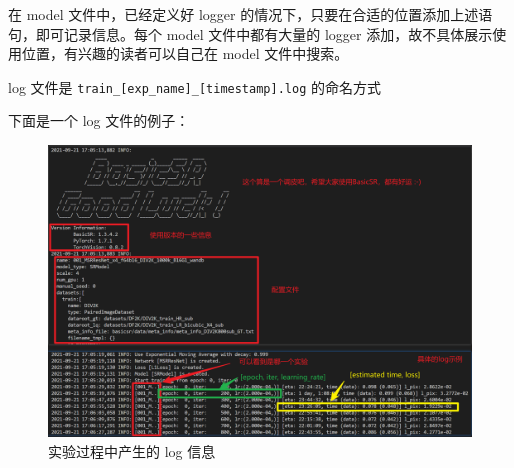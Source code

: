 \documentclass[../main.tex]{subfiles}
\begin{document}
在 model 文件中，已经定义好 logger 的情况下，只要在合适的位置添加上述语句，即可记录信息。每个 model 文件中都有大量的 logger 添加，故不具体展示使用位置，有兴趣的读者可以自己在 model 文件中搜索。

log 文件是 \texttt{train\_[exp\_name]\_[timestamp].log} 的命名方式

下面是一个 log 文件的例子：

\begin{figure}[H]
    \begin{center}
        \includegraphics[width=0.7\linewidth]{figures/getting_start_6.png}
        \caption{实验过程中产生的 log 信息}
        \label{fig:getting_start_6}
    \end{center}
    \vspace{-0.5cm}
\end{figure}
\end{document}
